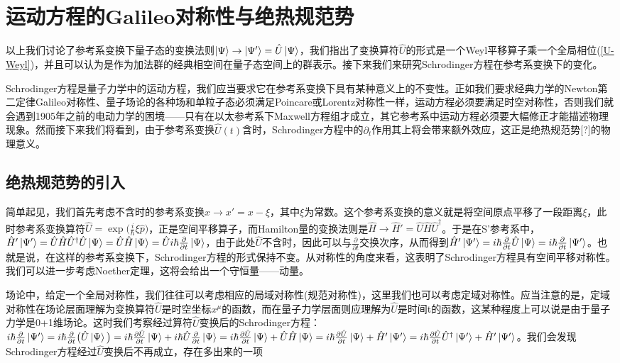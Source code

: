 \documentclass[a4paper]{article}
\begin{document}
    \section{运动方程的Galileo对称性与绝热规范势}

        以上我们讨论了参考系变换下量子态的变换法则$\ket{\Psi}\to\ket{\Psi'}=\hat{U}\ket{\Psi}$，我们指出了变换算符$\hat{U}$的形式是一个Weyl平移算子乘一个全局相位(\ref{U-Weyl})，并且可以认为是作为加法群的经典相空间在量子态空间上的群表示。接下来我们来研究Schrodinger方程在参考系变换下的变化。

        Schrodinger方程是量子力学中的运动方程，我们应当要求它在参考系变换下具有某种意义上的不变性。正如我们要求经典力学的Newton第二定律Galileo对称性、量子场论的各种场和单粒子态必须满足Poincare或Lorentz对称性一样，运动方程必须要满足时空对称性，否则我们就会遇到1905年之前的电动力学的困境——只有在以太参考系下Maxwell方程组才成立，其它参考系中运动方程必须要大幅修正才能描述物理现象。然而接下来我们将看到，由于参考系变换$\hat{U}(t)$含时，Schrodinger方程中的$\partial_t$作用其上将会带来额外效应，这正是绝热规范势[?]的物理意义。

        \subsection{绝热规范势的引入}

        简单起见，我们首先考虑不含时的参考系变换$x\rightarrow x'=x-\xi$，其中$\xi$为常数。这个参考系变换的意义就是将空间原点平移了一段距离$\xi$，此时参考系变换算符$\hat{U}=\exp\big(\frac{i}{\hbar}\xi\hat{p} \big)$，正是空间平移算子，而Hamilton量的变换法则是$\hat{H}\rightarrow \hat{H}'=\hat{U}\hat{H}\hat{U}^\dagger$。于是在S'参考系中，$\hat{H}'\ket{\Psi'}=\hat{U}\hat{H}\hat{U}^\dagger\hat{U}\ket{\Psi}=\hat{U}\hat{H}\ket{\Psi}=\hat{U} i\hbar\frac{\partial}{\partial t}\ket{\Psi}$，由于此处$\hat{U}$不含时，因此可以与$\frac{\partial}{\partial t}$交换次序，从而得到$\hat{H}'\ket{\Psi'}=i\hbar\frac{\partial}{\partial t}\hat{U}\ket{\Psi}=i\hbar\frac{\partial}{\partial t}\ket{\Psi'}$。也就是说，在这样的参考系变换下，Schrodinger方程的形式保持不变。从对称性的角度来看，这表明了Schrodinger方程具有空间平移对称性。我们可以进一步考虑Noether定理，这将会给出一个守恒量——动量。

        场论中，给定一个全局对称性，我们往往可以考虑相应的局域对称性(规范对称性)，这里我们也可以考虑定域对称性。应当注意的是，定域对称性在场论层面理解为变换算符$\hat{U}$是时空坐标$x^\mu$的函数，而在量子力学层面则应理解为$\hat{U}$是时间t的函数，这某种程度上可以说是由于量子力学是0+1维场论。这时我们考察经过算符$\hat{U}$变换后的Schrodinger方程：$i\hbar\frac{\partial}{\partial t}\ket{\Psi'} = i\hbar\frac{\partial}{\partial t}\big(\hat{U}\ket{\Psi}\big) = i\hbar\frac{\partial\hat{U}}{\partial t}\ket{\Psi} + i\hbar\hat{U}\frac{\partial}{\partial t}\ket{\Psi} = i\hbar\frac{\partial\hat{U}}{\partial t}\ket{\Psi} + \hat{U}\hat{H}\ket{\Psi} = i\hbar\frac{\partial\hat{U}}{\partial t}\ket{\Psi} + \hat{H}'\ket{\Psi'} = i\hbar\frac{\partial\hat{U}}{\partial t}\hat{U}^\dagger\ket{\Psi'} + \hat{H}'\ket{\Psi'}$。我们会发现Schrodinger方程经过$\hat{U}$变换后不再成立，存在多出来的一项
        
\end{document}
